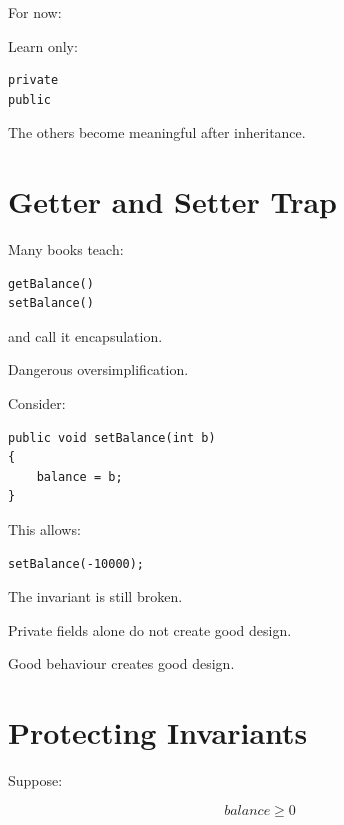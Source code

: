 \documentclass[11pt,a4paper]{book}
\begin{document}
For now:

Learn only:

\begin{verbatim}
private
public
\end{verbatim}

The others become meaningful after inheritance.


\section{Getter and Setter Trap}

Many books teach:

\begin{verbatim}
getBalance()
setBalance()
\end{verbatim}

and call it encapsulation.

Dangerous oversimplification.


Consider:

\begin{verbatim}
public void setBalance(int b)
{
    balance = b;
}
\end{verbatim}

This allows:

\begin{verbatim}
setBalance(-10000);
\end{verbatim}

The invariant is still broken.


\begin{rosettarule}

Private fields alone do not create good design.

Good behaviour creates good design.

\end{rosettarule}


\section{Protecting Invariants}

Suppose:

\[
balance \ge 0
\]
\end{document}

